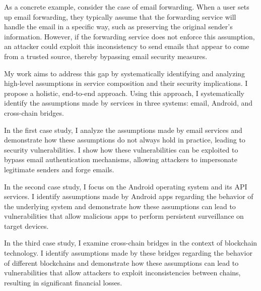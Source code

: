 \begin{dissertationintroduction}
As a concrete example, consider the case of email forwarding. When a user sets up email forwarding, they typically assume that the forwarding service will handle the email in a specific way, such as preserving the original sender's information. However, if the forwarding service does not enforce this assumption, an attacker could exploit this inconsistency to send emails that appear to come from a trusted source, thereby bypassing email security measures.

My work aims to address this gap by systematically identifying and analyzing high-level assumptions in service composition and their security implications. I propose a holistic, end-to-end approach. Using this approach, I systematically identify the assumptions made by services in three systems: email, Android, and cross-chain bridges.

In the first case study, I analyze the assumptions made by email services and demonstrate how these assumptions do not always hold in practice, leading to security vulnerabilities. I show how these vulnerabilities can be exploited to bypass email authentication mechanisms, allowing attackers to impersonate legitimate senders and forge emails.

In the second case study, I focus on the Android operating system and its API services. I identify assumptions made by Android apps regarding the behavior of the underlying system and demonstrate how these assumptions can lead to vulnerabilities that allow malicious apps to perform persistent surveillance on target devices.

In the third case study, I examine cross-chain bridges in the context of blockchain technology. I identify assumptions made by these bridges regarding the behavior of different blockchains and demonstrate how these assumptions can lead to vulnerabilities that allow attackers to exploit inconsistencies between chains, resulting in significant financial losses.





% 






\end{dissertationintroduction}
